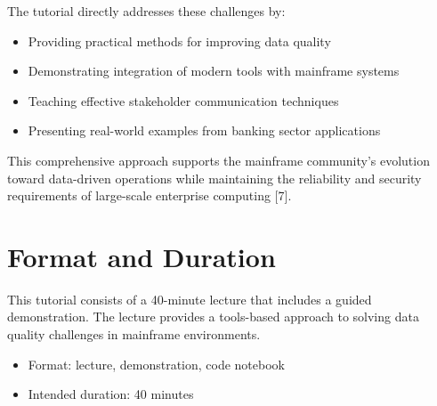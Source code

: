 \documentclass[a4paper]{article}
\begin{document}
The tutorial directly addresses these challenges by:
\begin{itemize}
    \item Providing practical methods for improving data quality
    \item Demonstrating integration of modern tools with mainframe systems
    \item Teaching effective stakeholder communication techniques
    \item Presenting real-world examples from banking sector applications
\end{itemize}

This comprehensive approach supports the mainframe community's evolution toward data-driven operations while maintaining the reliability and security requirements of large-scale enterprise computing [7].

\section{Format and Duration}
This tutorial consists of a 40-minute lecture that includes a guided demonstration. The lecture provides a tools-based approach to solving data quality challenges in mainframe environments.
\begin{itemize}
    \item Format: lecture, demonstration, code notebook
    \item Intended duration: 40 minutes
\end{itemize}
\end{document}
